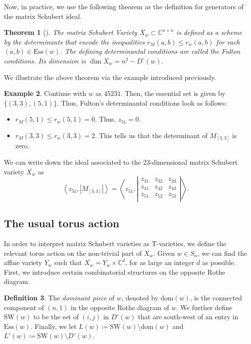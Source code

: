 \documentclass[11pt]{amsart}
\newtheorem{theorem}{Theorem}[section]
\theoremstyle{definition}
\newtheorem{example}[theorem]{Example}
\theoremstyle{definition}
\newtheorem{definition}[theorem]{Definition}
\theoremstyle{definition}
\theoremstyle{definition}
\newcommand{\Xw}{\overline{X_w}}
\newcommand{\SW}{\mathrm{SW}}
\newcommand{\Ess}{\mathrm{Ess}}
\newcommand{\Dc}{D^{\circ}}
\begin{document}
\noindent Now, in practice, we use the following theorem as the definition for generators of the matrix Schubert ideal.
\begin{theorem}[{\cite[Proposition 3.3, Lemma 3.10]{fulton1992flags}}]\label{thm:fultonessential}
    The matrix Schubert Variety $\overline{X_w} \subset \mathbb C^{n \times n}$ is defined as a scheme by the determinants that encode the inequalities $r_M(a,b) \leq r_w(a,b)$ for each $(a,b) \in \Ess(w)$. The defining determinantal conditions are called the \emph{Fulton conditions}.    
    Its dimension is $\dim \overline{X_w} = n^2 - \Dc(w)$.
\end{theorem}
\noindent We illustrate the above theorem via the example introduced previously.
\begin{example}
    Continue with $w$ as $45231$. Then, the essential set is given by $\{(3,3),(5,1)\}$. Thus, Fulton's determinantal conditions look as follows:
    \begin{itemize}
        \item $r_M(5,1) \leq r_w(5,1) = 0$. Thus, $z_{51} =0$.
        \item $r_M(3,3) \leq r_w(3,3) = 2$. This tells us that the determinant of $M_{[3,3]}$ is zero.
    \end{itemize}
    We can write down the ideal associated to the $23$-dimensional matrix Schubert variety $\Xw$ as
    $$\left\langle z_{51}, \left|M_{[3,3]}\right| \right\rangle = 
    \left\langle z_{51}, \left|\begin{array}{ccc}
        z_{31} & z_{32} & z_{33} \\
        z_{41} & z_{42} & z_{43} \\
        z_{51} & z_{52} & z_{53} \\
    \end{array}\right| \right\rangle.$$
\end{example}

\subsection{The usual torus action} In order to interpret matrix Schubert varieties as T-varieties, we define the relevant torus action on the non-trivial part of $\overline{X_w}$. 
Given $w \in S_n$, we can find the affine variety $Y_w$ such that $\overline{X_w} = Y_w \times \mathbb{C}^d$, for as large an integer $d$ as possible. First, we introduce certain combinatorial structures on the opposite Rothe diagram. 

\begin{definition}
    The \textit{dominant piece} of $w$, denoted by $\text{dom}(w)$, is the connected component of $(n,1)$ in the opposite Rothe diagram of $w$. We further define $\text{SW}(w)$ to be the set of $(i,j)$ in $D^{\circ}(w)$ that are south-west of an entry in $\text{Ess}(w)$. Finally, we let $L(w) \coloneqq \text{SW}(w) \setminus \text{dom}(w)$ and $L'(w) \coloneqq \SW(w)\setminus D^{\circ}(w)$. 
\end{definition}
\end{document}
